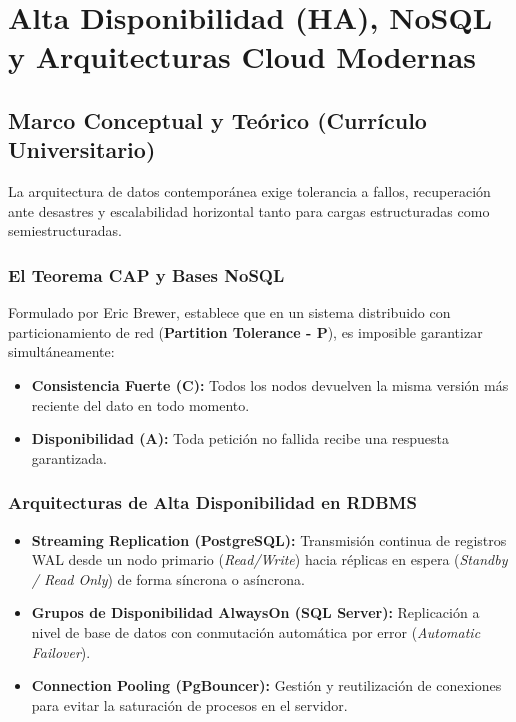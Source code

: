 \chapter{Alta Disponibilidad (HA), NoSQL y Arquitecturas Cloud Modernas}
\label{cap:alta_disponibilidad_nosql_cloud}

\section{Marco Conceptual y Te\'orico (Curr\'iculo Universitario)}

La arquitectura de datos contempor\'anea exige tolerancia a fallos, recuperaci\'on ante desastres y escalabilidad horizontal tanto para cargas estructuradas como semiestructuradas.

\subsection{El Teorema CAP y Bases NoSQL}
Formulado por Eric Brewer, establece que en un sistema distribuido con particionamiento de red (\textbf{Partition Tolerance - P}), es imposible garantizar simult\'aneamente:
\begin{itemize}
    \item \textbf{Consistencia Fuerte (C):} Todos los nodos devuelven la misma versi\'on m\'as reciente del dato en todo momento.
    \item \textbf{Disponibilidad (A):} Toda petici\'on no fallida recibe una respuesta garantizada.
\end{itemize}

\subsection{Arquitecturas de Alta Disponibilidad en RDBMS}
\begin{itemize}
    \item \textbf{Streaming Replication (PostgreSQL):} Transmisi\'on continua de registros WAL desde un nodo primario (\textit{Read/Write}) hacia r\'eplicas en espera (\textit{Standby / Read Only}) de forma s\'incrona o as\'incrona.
    \item \textbf{Grupos de Disponibilidad AlwaysOn (SQL Server):} Replicaci\'on a nivel de base de datos con conmutaci\'on autom\'atica por error (\textit{Automatic Failover}).
    \item \textbf{Connection Pooling (PgBouncer):} Gesti\'on y reutilizaci\'on de conexiones para evitar la saturaci\'on de procesos en el servidor.
\end{itemize}

